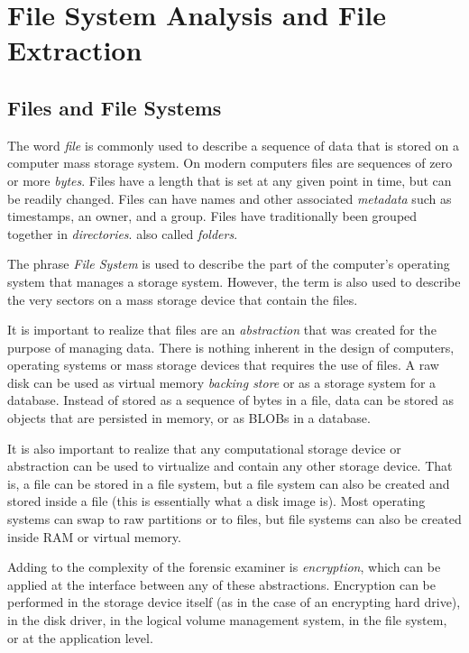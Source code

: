 \documentclass[11pt,letter]{article}
\begin{document}
\section{File System Analysis and File Extraction}

\subsection{Files and File Systems}
The word \emph{file} is commonly used to describe a sequence of data
that is stored on a computer mass storage system. On modern computers
files are sequences of zero or more \emph{bytes}. Files have a length
that is set at any given point in time, but can be readily
changed. Files can have names and other associated \emph{metadata}
such as timestamps, an owner, and a group. Files have traditionally
been grouped together in
\emph{directories}. also
called \emph{folders}.

The phrase \emph{File
  System} is
used to describe the part of the computer's operating system that
manages a storage system. However, the term is also used to describe
the very sectors on a mass storage device that contain the files.

It is important to realize that files are an \emph{abstraction} that
was created for the purpose of managing data. There is nothing
inherent in the design of computers, operating systems or mass storage
devices that requires the use of files. A raw disk can be used as
virtual memory \emph{backing store} or as a storage system for a
database. Instead of stored as a sequence of bytes in a file, data can be stored as
objects that are persisted in memory, or as BLOBs in a database.

It is also important to realize that any computational storage device
or abstraction can be used to virtualize and contain any other storage
device. That is, a file can be stored in a file system, but a file
system can also be created and stored inside a file (this is
essentially what a disk image is). Most operating systems can swap to raw
partitions or to files, but file systems can also be created inside
RAM or virtual memory.

Adding to the complexity of the forensic examiner is
\emph{encryption}, which can be applied at the interface between any
of these abstractions. Encryption can be performed in the storage
device itself (as in the case of an encrypting hard drive), in the
disk driver, in the logical volume management system, in the file
system, or at the application level.
\end{document}
